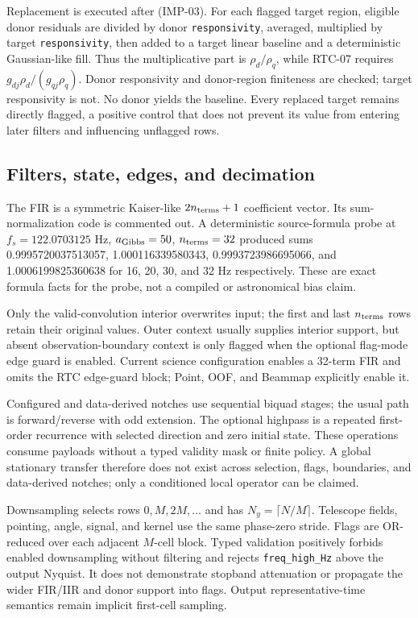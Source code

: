 \documentclass[11pt]{article}
\newcommand{\code}[1]{\nolinkurl{#1}}
\begin{document}
Replacement is executed after (IMP-03).  For each flagged target region,
eligible donor residuals are divided by donor \code{responsivity}, averaged,
multiplied by target \code{responsivity}, then added to a target linear
baseline and a deterministic Gaussian-like fill.  Thus the multiplicative
part is $\rho_d/\rho_q$, while RTC-07 requires
$g_{dj}\rho_d/(g_{qj}\rho_q)$.  Donor responsivity and donor-region finiteness
are checked; target responsivity is not.  No donor yields the baseline.  Every
replaced target remains directly flagged, a positive control that does not
prevent its value from entering later filters and influencing unflagged rows.

\subsection{Filters, state, edges, and decimation}

The FIR is a symmetric Kaiser-like $2n_{\rm terms}+1$ coefficient vector.  Its
sum-normalization code is commented out.  A deterministic source-formula probe
at $f_s=122.0703125$ Hz, $a_{\rm Gibbs}=50$, $n_{\rm terms}=32$ produced sums
0.9995720037513057, 1.000116339580343, 0.9993723986695066, and
1.0006199825360638 for 16, 20, 30, and 32 Hz respectively.  These are exact
formula facts for the probe, not a compiled or astronomical bias claim.

Only the valid-convolution interior overwrites input; the first and last
$n_{\rm terms}$ rows retain their original values.  Outer context usually
supplies interior support, but absent observation-boundary context is only
flagged when the optional flag-mode edge guard is enabled.  Current science
configuration enables a 32-term FIR and omits the RTC edge-guard block; Point,
OOF, and Beammap explicitly enable it.

Configured and data-derived notches use sequential biquad stages; the usual
path is forward/reverse with odd extension.  The optional highpass is a
repeated first-order recurrence with selected direction and zero initial state.
These operations consume payloads without a typed validity mask or finite
policy.  A global stationary transfer therefore does not exist across
selection, flags, boundaries, and data-derived notches; only a conditioned
local operator can be claimed.

Downsampling selects rows $0,M,2M,\ldots$ and has
$N_y=\lceil N/M\rceil$.  Telescope fields, pointing, angle, signal, and kernel
use the same phase-zero stride.  Flags are OR-reduced over each adjacent
$M$-cell block.  Typed validation positively forbids enabled downsampling
without filtering and rejects \code{freq_high_Hz} above the output Nyquist.
It does not demonstrate stopband attenuation or propagate the wider FIR/IIR
and donor support into flags.  Output representative-time semantics remain
implicit first-cell sampling.
\end{document}
